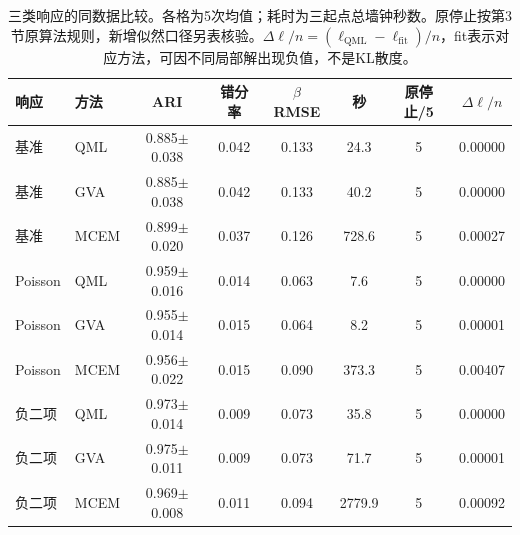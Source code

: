\begin{table}[H]\centering\small
\caption{三类响应的同数据比较。各格为5次均值；耗时为三起点总墙钟秒数。原停止按第3节原算法规则，新增似然口径另表核验。$\Delta\ell/n=(\ell_{\mathrm{QML}}-\ell_{\mathrm{fit}})/n$，fit表示对应方法，可因不同局部解出现负值，不是KL散度。}
\begin{tabular}{llcccccc}\toprule
响应 & 方法 & ARI & 错分率 & $\beta$ RMSE & 秒 & 原停止/5 & $\Delta\ell/n$\\\midrule
基准 & QML & 0.885$\pm$0.038 & 0.042 & 0.133 & 24.3 & 5 & 0.00000 \\
基准 & GVA & 0.885$\pm$0.038 & 0.042 & 0.133 & 40.2 & 5 & 0.00000 \\
基准 & MCEM & 0.899$\pm$0.020 & 0.037 & 0.126 & 728.6 & 5 & 0.00027 \\
Poisson & QML & 0.959$\pm$0.016 & 0.014 & 0.063 & 7.6 & 5 & 0.00000 \\
Poisson & GVA & 0.955$\pm$0.014 & 0.015 & 0.064 & 8.2 & 5 & 0.00001 \\
Poisson & MCEM & 0.956$\pm$0.022 & 0.015 & 0.090 & 373.3 & 5 & 0.00407 \\
负二项 & QML & 0.973$\pm$0.014 & 0.009 & 0.073 & 35.8 & 5 & 0.00000 \\
负二项 & GVA & 0.975$\pm$0.011 & 0.009 & 0.073 & 71.7 & 5 & 0.00001 \\
负二项 & MCEM & 0.969$\pm$0.008 & 0.011 & 0.094 & 2779.9 & 5 & 0.00092 \\
\bottomrule\end{tabular}\end{table}
